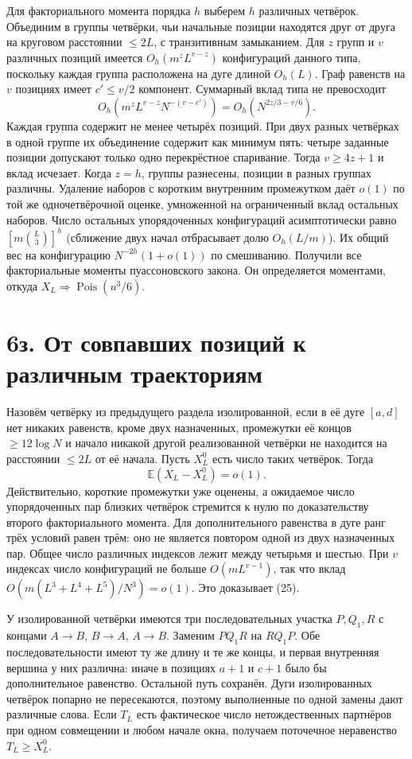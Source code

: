 \documentclass[11pt,a4paper]{article}
\newcommand{\sect}[1]{\section*{\sffamily\color{ink}#1}}
\begin{document}
Для факториального момента порядка $h$ выберем $h$ различных четвёрок. Объединим в группы четвёрки, чьи начальные позиции находятся друг от друга на круговом расстоянии $\le2L$, с транзитивным замыканием. Для $z$ групп и $v$ различных позиций имеется $O_h(m^z L^{v-z})$ конфигураций данного типа, поскольку каждая группа расположена на дуге длиной $O_h(L)$. Граф равенств на $v$ позициях имеет $c'\le v/2$ компонент. Суммарный вклад типа не превосходит
\[
 O_h(m^z L^{v-z}N^{-(v-c')})=O_h(N^{2z/3-v/6}).
\]
Каждая группа содержит не менее четырёх позиций. При двух разных четвёрках в одной группе их объединение содержит как минимум пять: четыре заданные позиции допускают только одно перекрёстное спаривание. Тогда $v\ge4z+1$ и вклад исчезает. Когда $z=h$, группы разнесены, позиции в разных группах различны. Удаление наборов с коротким внутренним промежутком даёт $o(1)$ по той же одночетвёрочной оценке, умноженной на ограниченный вклад остальных наборов. Число остальных упорядоченных конфигураций асимптотически равно $[m\binom L3]^h$ (сближение двух начал отбрасывает долю $O_h(L/m)$). Их общий вес на конфигурацию $N^{-2h}(1+o(1))$ по смешиванию. Получили все факториальные моменты пуассоновского закона. Он определяется моментами, откуда $X_L\Rightarrow\operatorname{Pois}(u^3/6)$.
\newpage
\sect{6з. От совпавших позиций к различным траекториям}
Назовём четвёрку из предыдущего раздела изолированной, если в её дуге $[a,d]$ нет никаких равенств, кроме двух назначенных, промежутки её концов $\ge12\log N$ и начало никакой другой реализованной четвёрки не находится на расстоянии $\le2L$ от её начала. Пусть $X_L^0$ есть число таких четвёрок. Тогда
\[
                       \mathbb E(X_L-X_L^0)=o(1).                           \tag{25}
\]
Действительно, короткие промежутки уже оценены, а ожидаемое число упорядоченных пар близких четвёрок стремится к нулю по доказательству второго факториального момента. Для дополнительного равенства в дуге ранг трёх условий равен трём: оно не является повтором одной из двух назначенных пар. Общее число различных индексов лежит между четырьмя и шестью. При $v$ индексах число конфигураций не больше $O(m L^{v-1})$, так что вклад $O(m(L^3+L^4+L^5)/N^3)=o(1)$. Это доказывает (25).

У изолированной четвёрки имеются три последовательных участка $P,Q_1,R$ с концами $A\to B$, $B\to A$, $A\to B$. Заменим $P Q_1 R$ на $R Q_1 P$. Обе последовательности имеют ту же длину и те же концы, и первая внутренняя вершина у них различна: иначе в позициях $a+1$ и $c+1$ было бы дополнительное равенство. Остальной путь сохранён. Дуги изолированных четвёрок попарно не пересекаются, поэтому выполненные по одной замены дают различные слова. Если $T_L$ есть фактическое число нетождественных партнёров при одном совмещении и любом начале окна, получаем поточечное неравенство $T_L\ge X_L^0$.
\end{document}
